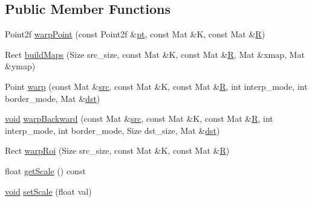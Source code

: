 \subsection*{Public Member Functions}
\begin{DoxyCompactItemize}
\item 
Point2f \hyperlink{classcv_1_1detail_1_1RotationWarperBase_ac77b06752bf8edee12a281d85c497a1b}{warp\-Point} (const Point2f \&\hyperlink{objdetect_8hpp_a69c6090aa56793ec8ef2457bc6d45b45}{pt}, const Mat \&K, const Mat \&\hyperlink{imgproc__c_8h_a51837f120208319f026dc8c4a71e56e0}{R})
\item 
Rect \hyperlink{classcv_1_1detail_1_1RotationWarperBase_a1fb8153656f3ae144be520245dae071c}{build\-Maps} (Size src\-\_\-size, const Mat \&K, const Mat \&\hyperlink{imgproc__c_8h_a51837f120208319f026dc8c4a71e56e0}{R}, Mat \&xmap, Mat \&ymap)
\item 
Point \hyperlink{classcv_1_1detail_1_1RotationWarperBase_adec180b584eed3586018998f68308072}{warp} (const Mat \&\hyperlink{legacy_8hpp_a371cd109b74033bc4366f584edd3dacc}{src}, const Mat \&K, const Mat \&\hyperlink{imgproc__c_8h_a51837f120208319f026dc8c4a71e56e0}{R}, int interp\-\_\-mode, int border\-\_\-mode, Mat \&\hyperlink{photo__c_8h_aed13e2a25279b24dc954073233fef7a5}{dst})
\item 
\hyperlink{legacy_8hpp_a8bb47f092d473522721002c86c13b94e}{void} \hyperlink{classcv_1_1detail_1_1RotationWarperBase_a17379efef91b209a58f09e89003db687}{warp\-Backward} (const Mat \&\hyperlink{legacy_8hpp_a371cd109b74033bc4366f584edd3dacc}{src}, const Mat \&K, const Mat \&\hyperlink{imgproc__c_8h_a51837f120208319f026dc8c4a71e56e0}{R}, int interp\-\_\-mode, int border\-\_\-mode, Size dst\-\_\-size, Mat \&\hyperlink{photo__c_8h_aed13e2a25279b24dc954073233fef7a5}{dst})
\item 
Rect \hyperlink{classcv_1_1detail_1_1RotationWarperBase_a6d1e3fa225896a69be90272f699648ba}{warp\-Roi} (Size src\-\_\-size, const Mat \&K, const Mat \&\hyperlink{imgproc__c_8h_a51837f120208319f026dc8c4a71e56e0}{R})
\item 
float \hyperlink{classcv_1_1detail_1_1RotationWarperBase_abc5f9a4609d4da834d5b79480bf10971}{get\-Scale} () const 
\item 
\hyperlink{legacy_8hpp_a8bb47f092d473522721002c86c13b94e}{void} \hyperlink{classcv_1_1detail_1_1RotationWarperBase_a4cea69682df1181b26ef9dc0691d66e0}{set\-Scale} (float val)
\end{DoxyCompactItemize}

